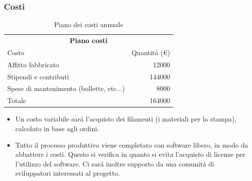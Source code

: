 \documentclass{beamer}
\begin{document}
    \begin{frame}
        \frametitle{Costi}
            \begin{table}[h]
                \begin{tabular}{lr}
                    \hline
                    \multicolumn{2}{c}{\textbf{Piano costi}} \\
                    \cline{1-2}
                    Costo & Quantit\'a (\euro{}) \\  \hline
                    Affitto fabbricato & 12000 \\
                    Stipendi e contributi & 144000 \\ 
                    Spese di mantenimento (bollette, etc...) & 8000 \\ \hline
                    Totale & 164000 \\
                    \hline
                \end{tabular}
                \caption{Piano dei costi annuale}
            \end{table}
            \begin{itemize}
                \item Un costo variabile sar\'a l'acquisto dei filamenti 
(i materiali per la stampa), calcolato in base agli ordini.
                \item Tutto il processo produttivo viene completato con 
software libero, in modo da abbattere i costi. Questo si 
verifica in quanto si evita l'acquisto di licenze per l'utilizzo del 
software. Ci sar\'a inoltre supporto da una comunit\'a di sviluppatori 
interessati al progetto.
            \end{itemize}
    \end{frame}
\end{document}
